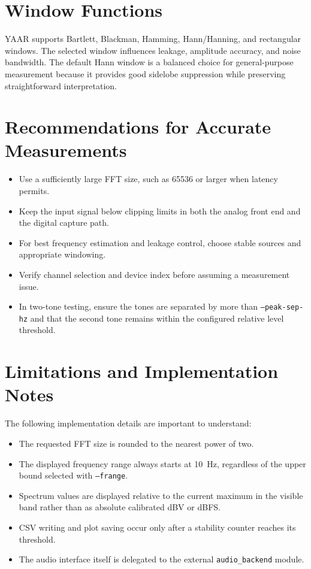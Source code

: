 \documentclass[conference]{IEEEtran}
\begin{document}
\section{Window Functions}
YAAR supports Bartlett, Blackman, Hamming, Hann/Hanning, and rectangular windows. The selected window influences leakage, amplitude accuracy, and noise bandwidth. The default Hann window is a balanced choice for general-purpose measurement because it provides good sidelobe suppression while preserving straightforward interpretation.

\section{Recommendations for Accurate Measurements}
\begin{itemize}[leftmargin=*,nosep]
    \item Use a sufficiently large FFT size, such as 65536 or larger when latency permits.
    \item Keep the input signal below clipping limits in both the analog front end and the digital capture path.
    \item For best frequency estimation and leakage control, choose stable sources and appropriate windowing.
    \item Verify channel selection and device index before assuming a measurement issue.
    \item In two-tone testing, ensure the tones are separated by more than \texttt{--peak-sep-hz} and that the second tone remains within the configured relative level threshold.
\end{itemize}

\section{Limitations and Implementation Notes}
The following implementation details are important to understand:
\begin{itemize}[leftmargin=*,nosep]
    \item The requested FFT size is rounded to the nearest power of two.
    \item The displayed frequency range always starts at \SI{10}{Hz}, regardless of the upper bound selected with \texttt{--frange}.
    \item Spectrum values are displayed relative to the current maximum in the visible band rather than as absolute calibrated dBV or dBFS.
    \item CSV writing and plot saving occur only after a stability counter reaches its threshold.
    \item The audio interface itself is delegated to the external \texttt{audio\_backend} module.
\end{itemize}
\end{document}
